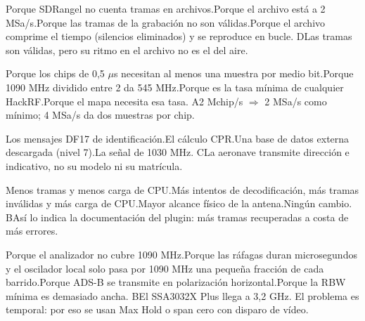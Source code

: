 {
{Porque SDRangel no cuenta tramas en archivos.}{Porque el archivo está a 2 MSa/s.}{Porque las tramas de la grabación no son válidas.}{Porque el archivo comprime el tiempo (silencios eliminados) y se reproduce en bucle.}
{D}{Las tramas son válidas, pero su ritmo en el archivo no es el del aire.}

{Porque los chips de 0,5 $\mu$s necesitan al menos una muestra por medio bit.}{Porque 1090 MHz dividido entre 2 da 545 MHz.}{Porque es la tasa mínima de cualquier HackRF.}{Porque el mapa necesita esa tasa.}
{A}{2 Mchip/s $\Rightarrow$ 2 MSa/s como mínimo; 4 MSa/s da dos muestras por chip.}

{Los mensajes DF17 de identificación.}{El cálculo CPR.}{Una base de datos externa descargada (nivel 7).}{La señal de 1030 MHz.}
{C}{La aeronave transmite dirección e indicativo, no su modelo ni su matrícula.}

{Menos tramas y menos carga de CPU.}{Más intentos de decodificación, más tramas inválidas y más carga de CPU.}{Mayor alcance físico de la antena.}{Ningún cambio.}
{B}{Así lo indica la documentación del plugin: más tramas recuperadas a costa de más errores.}

{Porque el analizador no cubre 1090 MHz.}{Porque las ráfagas duran microsegundos y el oscilador local solo pasa por 1090 MHz una pequeña fracción de cada barrido.}{Porque ADS-B se transmite en polarización horizontal.}{Porque la RBW mínima es demasiado ancha.}
{B}{El SSA3032X Plus llega a 3,2 GHz. El problema es temporal: por eso se usan Max Hold o span cero con disparo de vídeo.}
}
